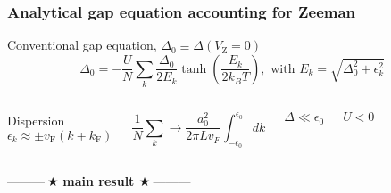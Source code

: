 \documentclass{beamer}
\begin{document}
\begin{frame}[noframenumbering]
\frametitle{Analytical gap equation accounting for Zeeman}

\begin{exampleblock}{Conventional gap equation, $\Delta_{0}\equiv\Delta(V_{\text{Z}}=0)$}
\begin{equation*}
\Delta_{0}=-\frac{U}{N}\sum_{k}\frac{\Delta_{0}}{2E_{k}}\tanh\left(\frac{E_{k}}{2k_{B}T}\right),\text{ with }E_{k}=\sqrt{\Delta_{0}^{2}+\epsilon_{k}^{2}}
\end{equation*}
\end{exampleblock}
\pause

\begin{columns}
\column{3.5cm}
\begin{alertblock}{Dispersion}
\vspace*{-5mm}
\begin{equation*}
\epsilon_{k}\approx\pm v_{\text{F}}(k\mp k_{\text{F}})
\end{equation*}
\end{alertblock}

\column{5cm}
\begin{alertblock}{}
\vspace*{-4mm}
\begin{equation*}
\frac{1}{N}\sum_{k}\rightarrow\frac{a_{0}^{2}}{2\pi Lv_{F}}\int_{-\epsilon_{0}}^{\epsilon_{0}}dk
\end{equation*}
\end{alertblock}

\column{2.5cm}
\begin{alertblock}{}
\vspace*{-6mm}
\begin{equation*}
\Delta\ll\epsilon_{0}
\end{equation*}
\end{alertblock}
\vspace*{-2mm}

\begin{alertblock}{}
\vspace*{-6mm}
\begin{equation*}
U<0
\end{equation*}
\end{alertblock}
\end{columns}

\pause
\vspace*{0.25cm}
\begin{center}
\Large \textcolor{red!80!black}{---------$\ \bigstar$ \textbf{main result $\bigstar\ $}---------}
\end{center}


\end{frame}
\end{document}
